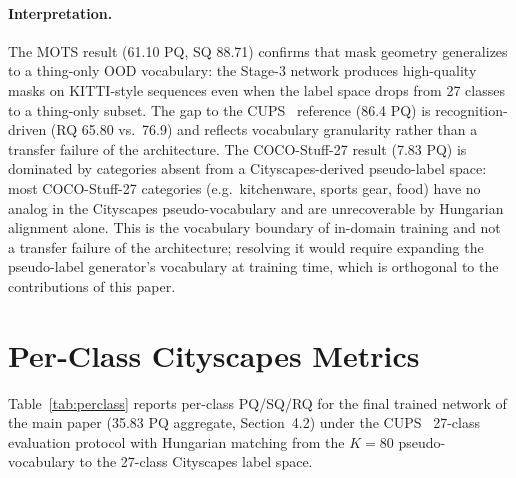 \documentclass{article}
\begin{document}
\paragraph{Interpretation.}
The MOTS result (61.10 PQ, SQ 88.71) confirms that mask geometry generalizes to a thing-only OOD vocabulary: the Stage-3 network produces high-quality masks on KITTI-style sequences even when the label space drops from 27 classes to a thing-only subset. The gap to the CUPS~\cite{hahn2025cups} reference (86.4 PQ) is recognition-driven (RQ 65.80 vs.\ 76.9) and reflects vocabulary granularity rather than a transfer failure of the architecture. The COCO-Stuff-27 result (7.83 PQ) is dominated by categories absent from a Cityscapes-derived pseudo-label space: most COCO-Stuff-27 categories (e.g.\ kitchenware, sports gear, food) have no analog in the Cityscapes pseudo-vocabulary and are unrecoverable by Hungarian alignment alone. This is the vocabulary boundary of in-domain training and not a transfer failure of the architecture; resolving it would require expanding the pseudo-label generator's vocabulary at training time, which is orthogonal to the contributions of this paper.

\section{Per-Class Cityscapes Metrics}
\label{sec:supp:perclass}

Table~\ref{tab:perclass} reports per-class PQ/SQ/RQ for the final trained network of the main paper (35.83 PQ aggregate, Section~4.2) under the CUPS~\cite{hahn2025cups} 27-class evaluation protocol with Hungarian matching from the $K{=}80$ pseudo-vocabulary to the 27-class Cityscapes label space.
\end{document}
